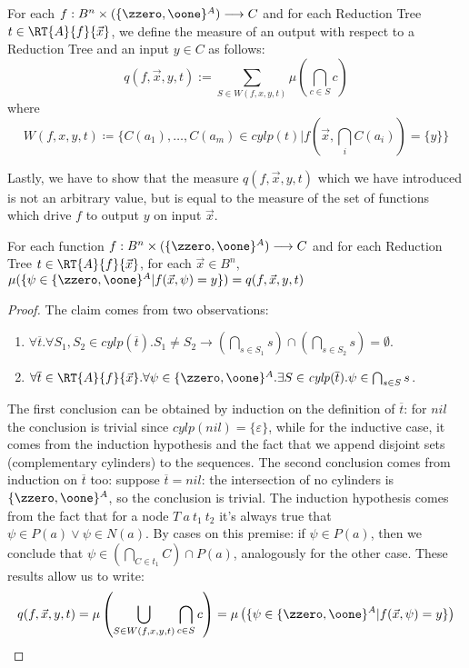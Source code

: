 \begin{conditional}{\notappendix}
  \begin{defn}
    For each $f: B^n\times (\{\zzero, \oone\}^A)\longrightarrow C$
    and for each Reduction Tree $t \in \RT{A} {f} {\vec x}$, we define
    the measure of an output with respect to a Reduction Tree and an input
    $y \in C$ as follows:
    \[
      q(f, \vec x, y, t) := \sum_{S \in W(f, x, y, t)}\mu(\bigcap_{c \in S} c)
    \]
    where
    \[
    W (f, x, y, t) \coloneqq \{C(a_1), \ldots, C(a_m) \in \mathit{cylp}(t)|
    f(\vec x, \bigcap_i C(a_i))=\{y\}\}
    \]
  \end{defn}

  Lastly, we have to show that the measure $q(f, \vec x, y, t)$
  which we have introduced is not an
  arbitrary value, but is equal to the measure of the
  set of functions which drive
  $f$ to output $y$ on input $\vec x$.

  \begin{lemma}
    \label{lemma:treetomeasure}
    For each function $f: B^n\times (\{\zzero, \oone\}^A)\longrightarrow C$
    and for each Reduction Tree $t \in \RT{A} {f} {\vec x}$, for each
    $\vec x \in B^n$,
    $\mu(\{\psi \in \{\zzero, \oone\}^A | f(\vec x, \psi)=y\})= q(f, \vec x, y, t)$
  \end{lemma}

  \begin{proof}
    The claim comes from two observations:
    \begin{enumerate}
      \item $\forall \overline t.
      \forall S_1, S_2 \in \mathit{cylp}(\overline t).
      S_1 \neq S_2 \to \left( \bigcap_{s \in S_1} s\right) \cap
      \left( \bigcap_{s \in S_2} s\right)= \emptyset$.
      \item $\forall \overline t \in \RT{A} {f} {\vec x}.\forall \psi \in \{\zzero, \oone\}^A.
       \exists S \in \mathit{cylp}(\overline t). \psi \in \bigcap_{s \in S} s$.
    \end{enumerate}
    The first conclusion can be obtained by induction on the definition of $\overline t$:
    for $\mathit{nil}$ the conclusion is trivial since
    $\mathit{cylp}(\mathit{nil})=\{\varepsilon\}$,
    while for the inductive case, it comes from the induction hypothesis
    and the fact that we append disjoint sets (complementary cylinders)
    to the sequences.
    The second conclusion comes from induction on $\overline t$ too:
    suppose $\overline t=\mathit{nil}$: the intersection of no cylinders is
    $\{\zzero, \oone\}^A$, so the conclusion is trivial.
    The induction hypothesis comes from the fact that for a node
    $T\ a\ t_1\ t_2$ it's always true that $\psi \in P(a) \lor \psi \in N(a)$.
    By cases on this premise: if $\psi \in P(a)$, then we conclude that
    $\psi \in \left(\bigcap_{C \in t_1} C \right)\cap P(a)$, analogously for
    the other case.
    These results allow us to write:
    \begin{align*}
      q(f, \vec x, y, t) = \mu\left(\bigcup_{S \in W(f, x, y, t)}\bigcap_{c \in S} c\right)=\mu\left(\{\psi \in \{\zzero, \oone\}^A | f(\vec x, \psi)=y\}\right)
    \end{align*}



\end{proof}
\end{conditional}
